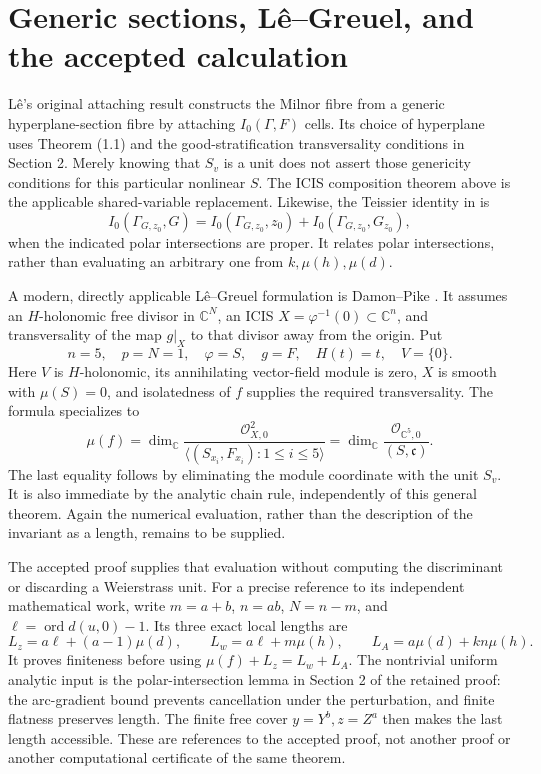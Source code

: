 \documentclass[11pt]{article}
\newcommand{\C}{\mathbb C}
\newcommand{\OO}{\mathcal O}
\newcommand{\crit}{\mathfrak c}
\newcommand{\ord}{\operatorname{ord}}
\begin{document}
\section{Generic sections, L\^e--Greuel, and the accepted calculation}

L\^e's original attaching result
\cite[Theorem (2.3) and Section (3.1), pp.~267--268]{le}
constructs the Milnor fibre from a generic hyperplane-section
fibre by attaching \(I_0(\Gamma,F)\) cells.  Its choice of
hyperplane uses Theorem (1.1) and the good-stratification
transversality conditions in Section 2.  Merely knowing that
\(S_v\) is a unit does not assert those genericity conditions
for this particular nonlinear \(S\).
The ICIS composition theorem above is the applicable
shared-variable replacement.  Likewise, the Teissier identity
in \cite[Exercise 3.3, p.~19]{massey} is
\[
 I_0(\Gamma_{G,z_0},G)=I_0(\Gamma_{G,z_0},z_0)
                  +I_0(\Gamma_{G,z_0},G_{z_0}),
\]
when the indicated polar intersections are proper.  It
relates polar intersections, rather than evaluating an arbitrary
one from \(k,\mu(h),\mu(d)\).

A modern, directly applicable L\^e--Greuel formulation is
Damon--Pike \cite[Theorem 3.3, equation (3-2), p.~923]{damon-pike}.
It assumes an \(H\)-holonomic free divisor in \(\C^N\), an
ICIS \(X=\varphi^{-1}(0)\subset\C^n\), and transversality of the
map \(g|_X\) to that divisor away from the origin.
Put
\[
 n=5,\quad p=N=1,\quad \varphi=S,\quad g=F,\quad
 H(t)=t,\quad V=\{0\}.
\]
Here \(V\) is \(H\)-holonomic, its annihilating vector-field
module is zero, \(X\) is smooth with \(\mu(S)=0\), and
isolatedness of \(f\) supplies the required transversality.
The formula specializes to
\[
 \mu(f)=
 \dim_\C
 \frac{\OO_{X,0}^2}
 {\langle(S_{x_i},F_{x_i}):1\leq i\leq5\rangle}
 =
 \dim_\C\frac{\OO_{\C^5,0}}{(S,\crit)}.
\]
The last equality follows by eliminating the module coordinate
with the unit \(S_v\).  It is also immediate by the analytic
chain rule, independently of this general theorem.
Again the numerical evaluation, rather than the description
of the invariant as a length, remains to be supplied.

The accepted proof supplies that evaluation without computing
the discriminant or discarding a Weierstrass unit.  For a
precise reference to its independent mathematical work, write
\(m=a+b\), \(n=ab\), \(N=n-m\), and
\(\ell=\ord d(u,0)-1\).  Its three exact local lengths are
\[
 L_z=a\ell+(a-1)\mu(d),\qquad
 L_w=a\ell+m\mu(h),\qquad
 L_A=a\mu(d)+kn\mu(h).
\]
It proves finiteness before using
\(\mu(f)+L_z=L_w+L_A\).
The nontrivial uniform analytic input is the polar-intersection
lemma in Section 2 of the retained proof: the arc-gradient
bound prevents cancellation under the perturbation, and
finite flatness preserves length.  The finite free cover
\(y=Y^b,z=Z^a\) then makes the last length accessible.
These are references to the accepted proof, not another proof
or another computational certificate of the same theorem.
\end{document}

